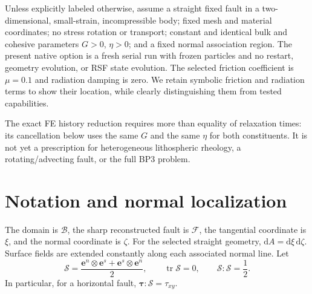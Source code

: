 \documentclass[11pt,a4paper]{article}
\newcommand{\B}{\mathcal B}
\newcommand{\F}{\mathcal F}
\newcommand{\Smat}{\bm{\mathcal S}}
\newcommand{\tauv}{\bm\tau}
\begin{document}
Unless explicitly labeled otherwise, assume a straight fixed fault in a
two-dimensional, small-strain, incompressible body; fixed mesh and material
coordinates; no stress rotation or transport; constant and identical bulk and
cohesive parameters $G>0$, $\eta>0$; and a fixed normal association region.
The present native option is a fresh serial run with frozen particles and no
restart, geometry evolution, or RSF state evolution. The selected friction
coefficient is $\mu=0.1$ and radiation damping is zero. We retain symbolic
friction and radiation terms to show their location, while clearly distinguishing
them from tested capabilities.

The exact FE history reduction requires more than equality of relaxation
times: its cancellation below uses the same $G$ and the same $\eta$ for both
constituents. It is not yet a prescription for heterogeneous lithospheric
rheology, a rotating/advecting fault, or the full BP3 problem.

\section{Notation and normal localization}
\label{sec:notation}

The domain is $\B$, the sharp reconstructed fault is $\F$, the tangential
coordinate is $\xi$, and the normal coordinate is $\zeta$. For the selected
straight geometry, $\mathrm dA=\mathrm d\xi\,\mathrm d\zeta$.
Surface fields are extended constantly along each associated normal line.
Let
\begin{equation}
 \Smat=\frac{\bm e^n\otimes\bm e^s+\bm e^s\otimes\bm e^n}{2},
 \qquad \operatorname{tr}\Smat=0,\qquad \Smat:\Smat=\frac12.
\end{equation}
In particular, for a horizontal fault, $\tauv:\Smat=\tau_{xy}$.
\end{document}
